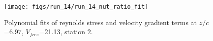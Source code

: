 \begin{figure}[H]
\centering
\texttt{[image: figs/run\_14/run\_14\_nut\_ratio\_fit]}
\caption{Polynomial fits of reynolds stress and velocity gradient terms at $z/c$=6.97, $V_{free}$=21.13, station 2.}
\label{fig:run_14_nut_ratio_fit}
\end{figure}


